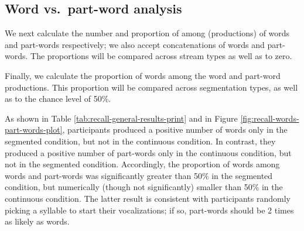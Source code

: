 \documentclass[]{article}
\begin{document}
\subsection{Word vs.~part-word
analysis}\label{word-vs.part-word-analysis}

We next calculate the number and proportion of among (productions) of
words and part-words respectively; we also accept concatenations of
words and part-words. The proportions will be compared across stream
types as well as to zero.

Finally, we calculate the proportion of words among the word and
part-word productions. This proportion will be compared across
segmentation types, as well as to the chance level of 50\%.

As shown in Table \ref{tab:recall-general-results-print} and in Figure
\ref{fig:recall-words-part-words-plot}, participants produced a positive
number of words only in the segmented condition, but not in the
continuous condition. In contrast, they produced a positive number of
part-words only in the continuous condition, but not in the segmented
condition. Accordingly, the proportion of words among words and
part-words was significantly greater than 50\% in the segmented
condition, but numerically (though not significantly) smaller than 50\%
in the continuous condition. The latter result is consistent with
participants randomly picking a syllable to start their vocalizations;
if so, part-words should be 2 times as likely as words.
\end{document}

